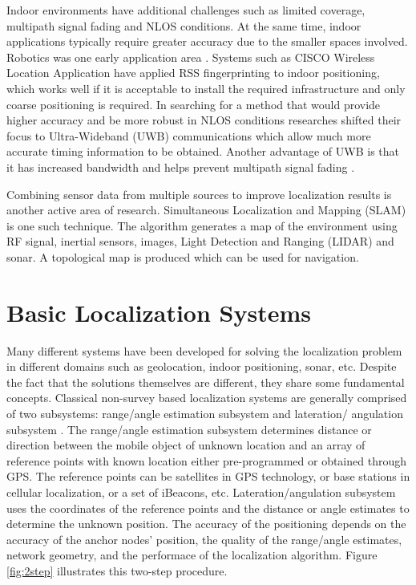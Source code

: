 Indoor environments have additional challenges such as limited coverage, multipath signal fading and NLOS conditions. At the same time, indoor applications typically require greater accuracy due to the smaller spaces involved. Robotics was one early application area \cite{Durant}. Systems such as CISCO Wireless Location Application \cite{CiscoWLA} have applied RSS fingerprinting to indoor positioning, which works well if it is acceptable to install the required infrastructure and only coarse positioning is required. In searching for a method that would provide higher accuracy and be more robust in NLOS conditions researches shifted their focus to Ultra-Wideband (UWB) communications which allow much more accurate timing information to be obtained. Another advantage of UWB is that it has increased bandwidth and helps prevent multipath signal fading \cite{AlaviUWB}.

Combining sensor data from multiple sources to improve localization results is another active area of research. Simultaneous Localization and Mapping (SLAM) is one such technique. The algorithm generates a map of the environment using RF signal, inertial sensors, images, Light Detection and Ranging (LIDAR) and sonar. A topological map is produced which can be used for navigation.



\section{Basic Localization Systems}

Many different systems have been developed for solving the localization problem in different domains such as geolocation, indoor positioning, sonar, etc. Despite the fact that the  solutions themselves are different, they share some fundamental concepts. Classical non-survey based localization systems  are generally comprised of two subsystems: range/angle estimation subsystem and lateration/
angulation subsystem \cite{GeoLoc}. The range/angle estimation subsystem determines distance or direction between the  mobile object of unknown location  and an array of reference points with known location  either pre-programmed or obtained through GPS.  The reference points can be satellites in GPS technology, or base stations in cellular localization, or a set of iBeacons, etc. Lateration/angulation subsystem uses the coordinates of the reference points and the distance or angle estimates to determine the unknown position.  The accuracy of the positioning depends on the accuracy of the anchor nodes’ position, the quality of the range/angle estimates, network geometry, and the performace of the localization algorithm. Figure \ref{fig:2step} illustrates this two-step procedure.


